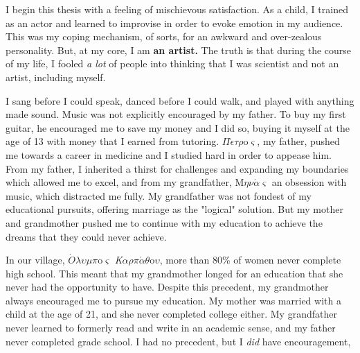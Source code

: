 \documentclass[12pt]{ucsddissertation}
\begin{document}
{\begin{tabular}{@{}l l}
\end{tabular}

\bigskip %


}

\listoffigures
\listofscheme
\listoftables


\begin{preface}
I begin this thesis with a feeling of mischievous satisfaction. As a child, I trained as an actor and learned to improvise in order to evoke emotion in my audience. This was my coping mechanism, of sorts, for an awkward and over-zealous personality. But, at my core, I am \textbf{an artist.} The truth is that during the course of my life, I fooled \textit{a lot} of people into thinking that I was scientist and not an artist, including myself. 

I sang before I could speak, danced before I could walk, and played with anything made sound. Music was not explicitly encouraged by my father. To buy my first guitar, he encouraged me to save my money and I did so, buying it myself at the age of 13 with money that I earned from tutoring.  $\Pi\acute{\epsilon}\tau\rho$o$\varsigma$, my father, pushed me towards a career in medicine and I studied hard in order to appease him. From my father, I inherited a thirst for challenges and expanding my boundaries which allowed me to excel, and from my grandfather, M$\eta\nu\acute{\alpha}\varsigma$ an obsession with music, which distracted me fully. My grandfather was not fondest of my educational pursuits, offering marriage as the "logical" solution. But my mother and grandmother pushed me to continue with my education to achieve the dreams that they could never achieve. 

In our village, $\acute{O}\lambda\upsilon\mu\pi$o$\varsigma$ \textit{K}$\alpha\rho\pi\acute{\alpha}\theta$o$\upsilon$, more than 80\% of women never complete high school. This meant that my grandmother longed for an education that she never had the opportunity to have. Despite this precedent, my grandmother always encouraged me to pursue my education. My mother was married with a child at the age of 21, and she never completed college either. My grandfather never learned to formerly read and write in an academic sense, and my father never completed grade school. I had no precedent, but I \textit{did} have encouragement,  


\end{preface}
\end{document}
